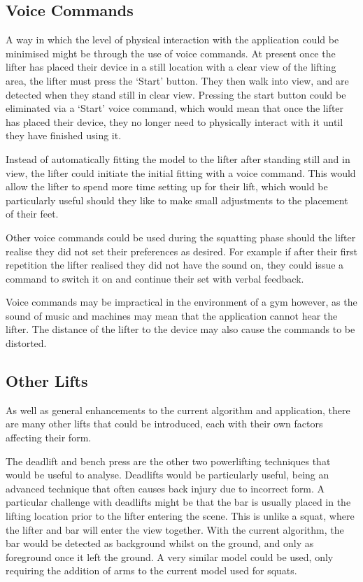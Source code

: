\subsection{Voice Commands}

A way in which the level of physical interaction with the application could be minimised might be through the use of voice commands. At present once the lifter has placed their device in a still location with a clear view of the lifting area, the lifter must press the `Start' button. They then walk into view, and are detected when they stand still in clear view. Pressing the start button could be eliminated via a `Start' voice command, which would mean that once the lifter has placed their device, they no longer need to physically interact with it until they have finished using it.

Instead of automatically fitting the model to the lifter after standing still and in view, the lifter could initiate the initial fitting with a voice command. This would allow the lifter to spend more time setting up for their lift, which would be particularly useful should they like to make small adjustments to the placement of their feet.

Other voice commands could be used during the squatting phase should the lifter realise they did not set their preferences as desired. For example if after their first repetition the lifter realised they did not have the sound on, they could issue a command to switch it on and continue their set with verbal feedback.

Voice commands may be impractical in the environment of a gym however, as the sound of music and machines may mean that the application cannot hear the lifter. The distance of the lifter to the device may also cause the commands to be distorted.

\subsection{Other Lifts}

As well as general enhancements to the current algorithm and application, there are many other lifts that could be introduced, each with their own factors affecting their form.

The deadlift and bench press are the other two powerlifting techniques that would be useful to analyse. Deadlifts would be particularly useful, being an advanced technique that often causes back injury due to incorrect form. A particular challenge with deadlifts might be that the bar is usually placed in the lifting location prior to the lifter entering the scene. This is unlike a squat, where the lifter and bar will enter the view together. With the current algorithm, the bar would be detected as background whilst on the ground, and only as foreground once it left the ground. A very similar model could be used, only requiring the addition of arms to the current model used for squats.

